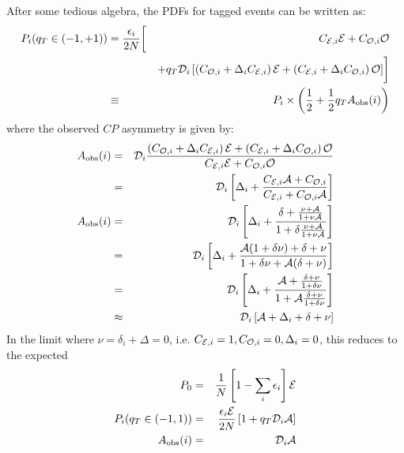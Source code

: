 \documentclass[a4paper,9pt,twosided]{article}
\begin{document}
After some tedious algebra, the PDFs for tagged events can be written as:
\begin{eqnarray}
  P_i(q_T\in (-1,+1))  &= \frac{\epsilon_i}{2N}\biggl[& C_{{\cal E},i}{\cal E} + C_{{\cal O},i}{\cal O}   \nonumber
\\           &&+ q_T {\cal D}_i \left[ \left( C_{{\cal O},i} + {\Delta}_i C_{{\cal E},i} \right) {\cal E} 
                                     + \left( C_{{\cal E},i} + {\Delta}_i C_{{\cal O},i} \right) {\cal O}  \right] \biggr] \nonumber
\\ &\equiv& P_i \times \left( \frac{ 1}{2} + \frac{1}{2} q_T A_{\mathrm{obs}}(i) \right)
\label{eq:substrule_e}
\end{eqnarray}
where the observed $CP$ asymmetry is given by:
\begin{eqnarray}
  A_{\mathrm{obs}}(i) &=&  {\cal D}_i \frac{\left(C_{{\cal O},i}+{\Delta}_i C_{{\cal E},i}\right) {\cal E}+\left( C_{{\cal E},i} + {\Delta}_i C_{{\cal O},i} \right){\cal O}}
                               { C_{{\cal E},i}{\cal E}+ C_{{\cal O},i}{\cal O} }
\\  &=& {\cal D}_i \left[ \Delta_i + \frac{C_{{\cal E},i}{\cal A}+C_{{\cal O},i} }{ C_{{\cal E},i} + C_{{\cal O},i}{\cal A} }\right]
\\A_{\mathrm{obs}}(i) &=&    {\cal D}_i \left[ \Delta_i + \frac{\delta+\frac{\nu+{\cal A}}{1+\nu{\cal A}}}{1+\delta\frac{\nu+{\cal A}}{1+\nu{\cal A}}}\right] 
\\          &=&    {\cal D}_i \left[ \Delta_i + \frac{{\cal A}(1+\delta\nu)+\delta+\nu}{1+\delta\nu+{\cal A}(\delta+\nu)} \right] 
\\          &=&    {\cal D}_i \left[ \Delta_i + \frac{{\cal A}+\frac{\delta+\nu}{1+\delta\nu}}{1+{\cal A}\frac{\delta+\nu}{1+\delta\nu}} \right] \label{eq:ACPintermsofA}
\\       &\approx& {\cal D}_i \left[ {\cal A} + \Delta_i + \delta + \nu \right]
\end{eqnarray}
In the limit where $\nu=\delta_i+{\Delta}=0$, i.e. $C_{{\cal E},i} =1, C_{{\cal O},i}=0, \Delta_i = 0$, this reduces to the expected
\begin{eqnarray}
   P_0 &=&\frac{1}{N} \left[ 1-\sum_i \epsilon_i \right]{\cal E} \\
   P_i(q_T\in(-1,1)) &=& \frac{\epsilon_i{\cal E}}{2N}\left[ 1  +q_T {\cal D}_i {\cal A}\right]  \label{eq:substrule_s}\\
   A_{\mathrm{obs}}(i) &=&   {\cal D}_i {\cal A}
\end{eqnarray}
\end{document}
